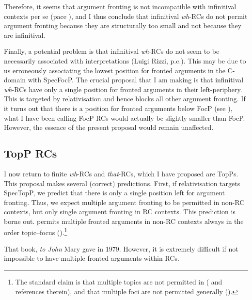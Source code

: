 \documentclass[output=paper]{langsci/langscibook}
\begin{document}
\ea\label{ex:2.82}
    \z
\z
Therefore, it seems that argument fronting is not incompatible with infinitival
contexts per se (pace \citealt{Bianchi1999}), and I thus conclude that
infinitival \emph{wh}{-\glspl{RC} do not permit argument fronting because they are
structurally too small} and not because they are infinitival.

Finally, a potential problem is that infinitival \emph{wh}{-\glspl{RC} do not seem
to be necessarily associated with  interpretations (Luigi Rizzi, p.c.).}
This may be due to us erroneously associating the lowest position for fronted
arguments in the C-domain with SpecFocP\@. The crucial proposal that I am making
is that infinitival \emph{wh}{-\glspl{RC} have only a single} position for fronted
arguments in their left-periphery. This is targeted by relativisation and hence
blocks all other argument fronting. If it turns out that there is a position
for fronted arguments below FocP (see \citealt[83,
fn.\ 15]{Douglas2016}), what I have
been calling FocP \glspl{RC} would actually be slightly smaller than FocP\@. However,
the essence of the present proposal would remain unaffected.

\subsection{TopP RCs}\label{sec:02.4.4}

I now return to finite \emph{wh}{-\glspl{RC} and} \emph{that}{-RCs, which I have
proposed are TopPs.} This proposal makes several (correct) predictions. First,
if relativisation targets SpecTopP, we predict that there is only a single
position left for argument fronting. Thus, we expect multiple argument fronting
to be permitted in non-RC contexts, but only single argument fronting in RC
contexts. This prediction is borne out.  permits multiple fronted
arguments in non-RC contexts always in the order topic--focus
(\citealt{Culicover1991,Haegeman2012}).\footnote{The standard claim is that
multiple topics are not permitted in  (\citealt{Haegeman2012} and
references therein), and that multiple foci are not permitted generally
(\citealt{Haegeman2012,Rizzi1997}).}

\ea\label{ex:2.83}
    That book, \emph{to John} Mary gave in 1979.
\z
However, it is extremely difficult if not impossible to have multiple fronted
arguments within \glspl{RC}.
\end{document}
